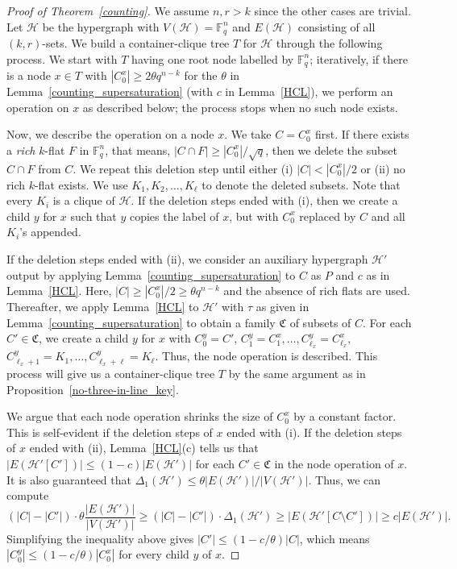 \documentclass[10pt,a4paper]{amsart}
\begin{document}
\begin{proof}[Proof of Theorem~\ref{counting}]

    We assume $n,r > k$ since the other cases are trivial. Let $\mathcal{H}$ be the hypergraph with $V(\mathcal{H}) = \mathbb{F}^n_q$ and $E(\mathcal{H})$ consisting of all $(k,r)$-sets. We build a container-clique tree $T$ for $\mathcal{H}$ through the following process. We start with $T$ having one root node labelled by $\mathbb{F}_q^n$; iteratively, if there is a node $x \in T$ with $|C^x_0| \geq 2\theta q^{n-k}$ for the $\theta$ in Lemma~\ref{counting_supersaturation} (with $c$ in Lemma~\ref{HCL}), we perform an operation on $x$ as described below; the process stops when no such node exists.

    Now, we describe the operation on a node $x$. We take $C = C^x_0$ first. If there exists a \textit{rich} $k$-flat $F$ in $\mathbb{F}_q^n$, that means, $|C \cap F| \geq |C^x_0|/\sqrt{q}$, then we delete the subset $C \cap F$ from $C$. We repeat this deletion step until either (i) $|C| < |C^x_0|/2$ or (ii) no rich $k$-flat exists. We use $K_1,K_2,\dots,K_\ell$ to denote the deleted subsets. Note that every $K_i$ is a clique of $\mathcal{H}$. If the deletion steps ended with (i), then we create a child $y$ for $x$ such that $y$ copies the label of $x$, but with $C^x_0$ replaced by $C$ and all $K_i$'s appended.

    If the deletion steps ended with (ii), we consider an auxiliary hypergraph $\mathcal{H}'$ output by applying Lemma~\ref{counting_supersaturation} to $C$ as $P$ and $c$ as in Lemma~\ref{HCL}. Here, $|C| \geq |C^x_0|/2 \geq \theta q^{n-k}$ and the absence of rich flats are used. Thereafter, we apply Lemma~\ref{HCL} to $\mathcal{H}'$ with $\tau$ as given in Lemma~\ref{counting_supersaturation} to obtain a family $\mathfrak{C}$ of subsets of $C$. For each $C' \in \mathfrak{C}$, we create a child $y$ for $x$ with $C^y_0 = C'$, $C^y_1 = C^x_1, \dots, C^y_{\ell_x}=C^x_{\ell_x}$, $C^y_{\ell_x+1} = K_1,\dots, C^y_{\ell_x+\ell} = K_\ell$. Thus, the node operation is described. This process will give us a container-clique tree $T$ by the same argument as in Proposition~\ref{no-three-in-line_key}.

    We argue that each node operation shrinks the size of $C^x_0$ by a constant factor. This is self-evident if the deletion steps of $x$ ended with (i). If the deletion steps of $x$ ended with (ii), Lemma~\ref{HCL}(c) tells us that $|E(\mathcal{H}'[C'])| \leq (1-c)|E(\mathcal{H}')|$ for each $C' \in \mathfrak{C}$ in the node operation of $x$. It is also guaranteed that $\Delta_1(\mathcal{H}')\leq \theta |E(\mathcal{H}')|/|V(\mathcal{H}')|$. Thus, we can compute \begin{equation*}
        (|C|-|C'|) \cdot \theta\frac{|E(\mathcal{H'})|}{|V(\mathcal{H'})|}\geq(|C|-|C'|)\cdot\Delta_1(\mathcal{H}')\geq|E(\mathcal{H'}[C\setminus C'])|\geq c|E(\mathcal{H}')|.
    \end{equation*} Simplifying the inequality above gives $|C'| \leq (1-c/\theta)|C|$, which means $|C^y_0| \leq (1-c/\theta)|C^x_0|$ for every child $y$ of $x$.


\end{proof}
\end{document}
